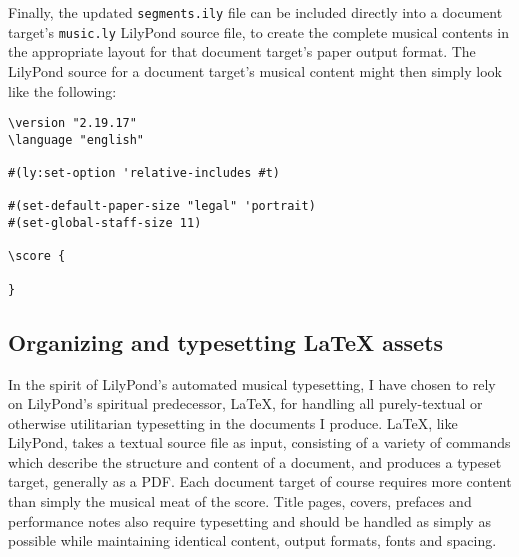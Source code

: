 \begin{singlespacing}
\vspace{-0.5\baselineskip}
\inputminted{tex}{../../Documents/Scores/ersilia/ersilia/build/segments.ily}
\end{singlespacing}

\noindent Finally, the updated \texttt{segments.ily} file can be included
directly into a document target's \texttt{music.ly} LilyPond source file, to
create the complete musical contents in the appropriate layout for that
document target's paper output format. The LilyPond source for a document
target's musical content might then simply look like the following:

\begin{singlespacing}
\vspace{-0.5\baselineskip}
\begin{verbatim}
\version "2.19.17"
\language "english"

#(ly:set-option 'relative-includes #t)

#(set-default-paper-size "legal" 'portrait)
#(set-global-staff-size 11)

\score {
    
}
\end{verbatim}
\end{singlespacing}

\subsection{Organizing and typesetting LaTeX assets}
\label{ssec:organizing-and-typesetting-latex-assets}

In the spirit of LilyPond's automated musical typesetting, I have chosen to
rely on LilyPond's spiritual predecessor, LaTeX, for handling all
purely-textual or otherwise utilitarian typesetting in the documents I produce.
LaTeX, like LilyPond, takes a textual source file as input, consisting of a
variety of commands which describe the structure and content of a document, and
produces a typeset target, generally as a PDF. Each document target of course
requires more content than simply the musical meat of the score. Title pages,
covers, prefaces and performance notes also require typesetting and should be
handled as simply as possible while maintaining identical content, output
formats, fonts and spacing.

